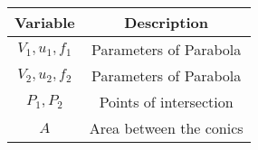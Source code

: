 \begin{tabular}[12pt]{ |c| c|}
    \hline
    \textbf{Variable} & \textbf{Description}\\ 
    \hline
    $V_1,u_1,f_1$ & Parameters of Parabola \\
    \hline 
    $V_2,u_2,f_2$ & Parameters of Parabola \\
    \hline
     $P_1,P_2$ & Points of intersection \\
     \hline
     $A$ & Area between the conics \\
    \hline
\end{tabular}
